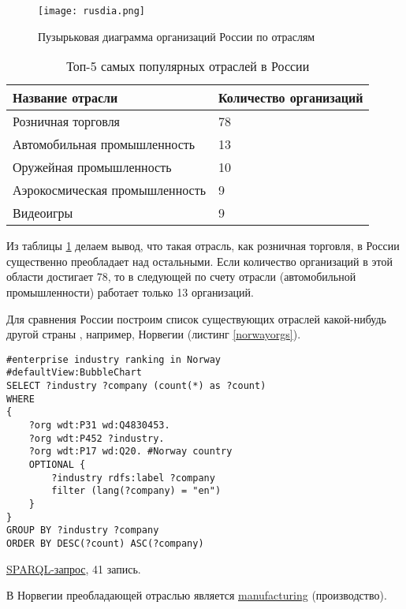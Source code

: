 \begin{figure}[h]
	\texttt{[image: rusdia.png]}
	\centering
	\caption{Пузырьковая диаграмма организаций России по отраслям}
	\centering
	\label{industrygraph2}
\end{figure}

\begin{table}[h]
\centering
\begin{tabular}{|l|l|}
\hline
\textbf{Название отрасли} & \textbf{Количество организаций} \\
\hline
Розничная торговля & 78 \\
\hline
Автомобильная промышленность & 13 \\	
\hline
Оружейная промышленность & 10 \\
\hline
Аэрокосмическая промышленность & 9 \\
\hline
Видеоигры & 9 \\
\hline
\end{tabular}
\caption{Топ-5 самых популярных отраслей в России}
\label{topindustryrus}
\end{table}

Из таблицы \ref{topindustryrus} делаем вывод, что такая отрасль, как розничная торговля, в России существенно преобладает над остальными. Если количество организаций в этой области достигает 78, то в следующей по счету отрасли (автомобильной промышленности) работает только 13 организаций.

Для сравнения России построим список существующих отраслей какой-нибудь другой страны , например, Норвегии (листинг \ref{norwayorgs}).

\begin{lstlisting}[language=SPARQL,label=norwayorgs,caption=Диаграмма распределения организаций по отраслям в Норвегии]
#enterprise industry ranking in Norway
#defaultView:BubbleChart
SELECT ?industry ?company (count(*) as ?count) 
WHERE 
{
    ?org wdt:P31 wd:Q4830453.
    ?org wdt:P452 ?industry.
    ?org wdt:P17 wd:Q20. #Norway country
    OPTIONAL {
		?industry rdfs:label ?company
		filter (lang(?company) = "en")
	}
}
GROUP BY ?industry ?company
ORDER BY DESC(?count) ASC(?company)
\end{lstlisting}

\href{https://query.wikidata.org/#%23enterprise%20industry%20ranking%20in%20Norway%0A%23defaultView%3ABubbleChart%0ASELECT%20%3Findustry%20%3Fcompany%20%28count%28%2a%29%20as%20%3Fcount%29%20%0AWHERE%20%0A%7B%0A%20%20%20%20%3Forg%20wdt%3AP31%20wd%3AQ4830453.%0A%20%20%20%20%3Forg%20wdt%3AP452%20%3Findustry%20.%0A%20%20%20%20%3Forg%20wdt%3AP17%20wd%3AQ20.%20%23Norway%20country%0A%20%20%20%20OPTIONAL%20%7B%0A%09%09%3Findustry%20rdfs%3Alabel%20%3Fcompany%0A%09%09filter%20%28lang%28%3Fcompany%29%20%3D%20%22en%22%29%0A%09%7D%0A%7D%0AGROUP%20BY%20%3Findustry%20%3Fcompany%0AORDER%20BY%20DESC%28%3Fcount%29%20ASC%28%3Fcompany%29%0A}{SPARQL-запрос}, 41 запись.

В Норвегии преобладающей отраслью является \href{https://www.wikidata.org/wiki/Q187939}{manufacturing} (производство).